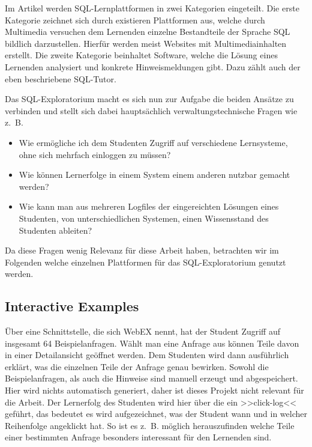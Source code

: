 Im Artikel \cite{explora1} werden SQL-Lernplattformen in zwei Kategorien eingeteilt. Die erste Kategorie zeichnet sich durch existieren Plattformen aus, welche durch Multimedia versuchen dem Lernenden einzelne Bestandteile der Sprache SQL bildlich darzustellen. Hierfür werden meist Websites mit Multimediainhalten erstellt. Die zweite Kategorie beinhaltet Software, welche die Lösung eines Lernenden analysiert und konkrete Hinweismeldungen gibt. Dazu zählt auch der eben beschriebene SQL-Tutor.

Das SQL-Exploratorium macht es sich nun zur Aufgabe die beiden Ansätze zu verbinden und stellt sich dabei hauptsächlich verwaltungstechnische Fragen wie \mbox{z. B.} 

\begin{itemize}
\item Wie ermögliche ich dem Studenten Zugriff auf verschiedene Lernsysteme, ohne sich mehrfach einloggen zu müssen?
\item Wie können Lernerfolge in einem System einem anderen nutzbar gemacht werden?
\item Wie kann man aus mehreren Logfiles der eingereichten Lösungen eines Studenten, von unterschiedlichen Systemen, einen Wissensstand des Studenten ableiten?
\end{itemize}

Da diese Fragen wenig Relevanz für diese Arbeit haben, betrachten wir im Folgenden welche einzelnen Plattformen für das SQL-Exploratorium genutzt werden.

\subsection{Interactive Examples}

Über eine Schnittstelle, die sich WebEX nennt, hat der Student Zugriff auf insgesamt 64 Beispielanfragen. Wählt man eine Anfrage aus können Teile davon in einer Detailansicht geöffnet werden. Dem Studenten wird dann ausführlich erklärt, was die einzelnen Teile der Anfrage genau bewirken. Sowohl die Beispielanfragen, als auch die Hinweise sind manuell erzeugt und abgespeichert. Hier wird nichts automatisch generiert, daher ist dieses Projekt nicht relevant für die Arbeit. Der Lernerfolg des Studenten wird hier über die ein >>click-log<< geführt, das bedeutet es wird aufgezeichnet, was der Student wann und in welcher Reihenfolge angeklickt hat. So ist es \mbox{z. B.} möglich herauszufinden welche Teile einer bestimmten Anfrage besonders interessant für den Lernenden sind.

